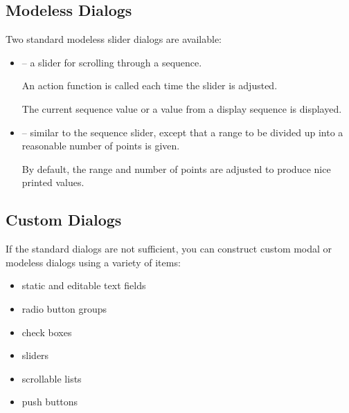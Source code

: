 \begin{slide}{}
\subsection{Modeless Dialogs}
Two standard modeless slider dialogs are available:
\begin{itemize}
\item
{} -- a slider for scrolling
through a sequence.

An action function is called each time the slider is adjusted.

The current sequence value or a value from a display sequence is displayed.
\item
{} -- similar to the sequence slider, except
that a range to be divided up into a reasonable number of points is given.

By default, the range and number of points are adjusted to produce nice
printed values.
\end{itemize}
\end{slide}

\begin{slide}{}
\subsection{Custom Dialogs}
If the standard dialogs are not sufficient, you can construct custom
modal or modeless dialogs using a variety of items:
\begin{itemize}
\item static and editable text fields
\item radio button groups
\item check boxes
\item sliders
\item scrollable lists
\item push  buttons
\end{itemize}
\end{slide}
